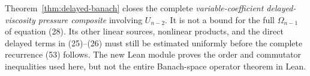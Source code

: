 Theorem~\ref{thm:delayed-banach} closes the complete
\emph{variable-coefficient delayed-viscosity pressure composite}
involving $U_{n-2}$. It is not a bound for the full $\Omega_{n-1}$
of equation (28). Its other linear sources, nonlinear products,
and the direct delayed terms in (25)--(26) must still be estimated
uniformly before the complete recurrence (53) follows.
The new Lean module proves the order and commutator inequalities
used here, but not the entire Banach-space operator theorem in Lean.
